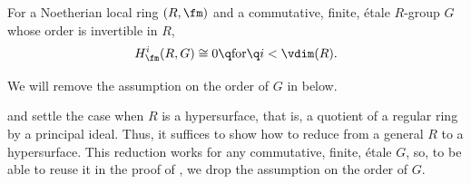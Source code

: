 




\bthm {}
For a Noetherian local ring $(R, \fm)$ and a commutative, finite, \'{e}tale $R$-group $G$ whose order is invertible in $R$,
\[
H^i_\fm(R, G) \cong 0 \q \text{for} \q i < \vdim(R).
\]
\ethm


We will remove the assumption on the order of $G$ in  below.

\bpf
{} and  settle the case when $R$ is a hypersurface, that is, a quotient of a regular ring by a principal ideal. Thus, it suffices to show how to reduce from a general $R$ to a hypersurface. This reduction works for any commutative, finite, \'{e}tale $G$, so, to be able to reuse it in the proof of , we drop the assumption on the order of $G$.

